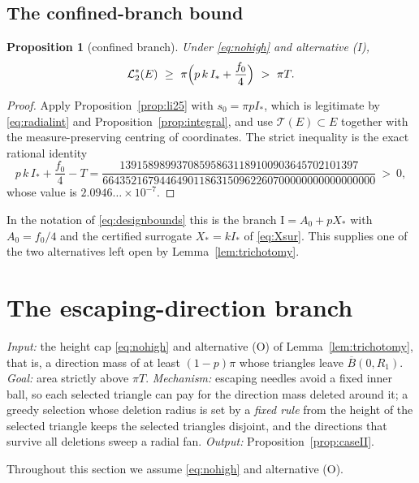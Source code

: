 \documentclass[11pt]{article}
\theoremstyle{plain}
\newtheorem{proposition}[theorem]{Proposition}
\theoremstyle{definition}
\theoremstyle{remark}
\newcommand{\Lout}{\mathcal{L}^{*}_{2}}
\newcommand{\Istar}{I_{*}}
\newcommand{\Tri}{\mathcal{T}}
\begin{document}
\subsection{The confined-branch bound}

\begin{proposition}[confined branch]\label{prop:caseI}
Under \eqref{eq:nohigh} and alternative (I),
\[
  \Lout(E)\ \ge\ \pi\Bigl(p\,k\,\Istar+\frac{f_{0}}{4}\Bigr)\ >\ \pi T .
\]
\end{proposition}

\begin{proof}
Apply Proposition~\ref{prop:li25} with $s_{0}=\pi p\Istar$, which is legitimate
by \eqref{eq:radialint} and Proposition~\ref{prop:integral}, and use
$\Tri(E)\subset E$ together with the measure-preserving centring of
coordinates. The strict inequality is the exact rational identity
\[
  p\,k\,\Istar+\frac{f_{0}}{4}-T
  =\frac{139158989937085958631189100903645702101397}
        {664352167944649011863150962260700000000000000000}
  \ >\ 0,
\]
whose value is $2.0946\ldots\times10^{-7}$.
\end{proof}

In the notation of \eqref{eq:designbounds} this is the branch
$\mathrm{I}=A_{0}+pX_{*}$ with $A_{0}=f_{0}/4$ and the certified surrogate
$X_{*}=k\Istar$ of \eqref{eq:Xsur}. This supplies one of the two alternatives left open by
Lemma~\ref{lem:trichotomy}.

\section{The escaping-direction branch}\label{sec:caseII}

\emph{Input:} the height cap \eqref{eq:nohigh} and alternative (O) of
Lemma~\ref{lem:trichotomy}, that is, a direction mass of at least $(1-p)\pi$
whose triangles leave $\overline B(0,R_{1})$. \emph{Goal:} area strictly above
$\pi T$. \emph{Mechanism:} escaping needles avoid a fixed inner ball, so each
selected triangle can pay for the direction mass deleted around it; a greedy
selection whose deletion radius is set by a \emph{fixed rule} from the height of
the selected triangle keeps the selected triangles disjoint, and the directions
that survive all deletions sweep a radial fan.
\emph{Output:} Proposition~\ref{prop:caseII}.

Throughout this section we assume \eqref{eq:nohigh} and alternative (O).
\end{document}
